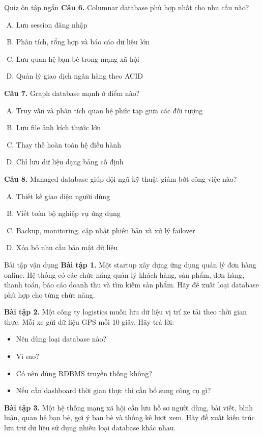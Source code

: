 \documentclass[aspectratio=169,11pt]{beamer}
\newcommand{\smallitem}{\setlength{\itemsep}{2pt}\setlength{\parskip}{0pt}}
\begin{document}
\begin{frame}[allowframebreaks]{Quiz ôn tập ngắn}
\textbf{Câu 6.} Columnar database phù hợp nhất cho nhu cầu nào?
\begin{enumerate}[A.]
  \item Lưu session đăng nhập
  \item Phân tích, tổng hợp và báo cáo dữ liệu lớn
  \item Lưu quan hệ bạn bè trong mạng xã hội
  \item Quản lý giao dịch ngân hàng theo ACID
\end{enumerate}

\textbf{Câu 7.} Graph database mạnh ở điểm nào?
\begin{enumerate}[A.]
  \item Truy vấn và phân tích quan hệ phức tạp giữa các đối tượng
  \item Lưu file ảnh kích thước lớn
  \item Thay thế hoàn toàn hệ điều hành
  \item Chỉ lưu dữ liệu dạng bảng cố định
\end{enumerate}

\textbf{Câu 8.} Managed database giúp đội ngũ kỹ thuật giảm bớt công việc nào?
\begin{enumerate}[A.]
  \item Thiết kế giao diện người dùng
  \item Viết toàn bộ nghiệp vụ ứng dụng
  \item Backup, monitoring, cập nhật phiên bản và xử lý failover
  \item Xóa bỏ nhu cầu bảo mật dữ liệu
\end{enumerate}
\end{frame}

\begin{frame}[allowframebreaks]{Bài tập vận dụng}
\small
\textbf{Bài tập 1.} Một startup xây dựng ứng dụng quản lý đơn hàng online. Hệ thống có các chức năng quản lý khách hàng, sản phẩm, đơn hàng, thanh toán, báo cáo doanh thu và tìm kiếm sản phẩm. Hãy đề xuất loại database phù hợp cho từng chức năng.

\vspace{3mm}
\textbf{Bài tập 2.} Một công ty logistics muốn lưu dữ liệu vị trí xe tải theo thời gian thực. Mỗi xe gửi dữ liệu GPS mỗi 10 giây. Hãy trả lời:
\begin{itemize}
  \smallitem
  \item Nên dùng loại database nào?
  \item Vì sao?
  \item Có nên dùng RDBMS truyền thống không?
  \item Nếu cần dashboard thời gian thực thì cần bổ sung công cụ gì?
\end{itemize}

\vspace{3mm}
\textbf{Bài tập 3.} Một hệ thống mạng xã hội cần lưu hồ sơ người dùng, bài viết, bình luận, quan hệ bạn bè, gợi ý bạn bè và thống kê lượt xem. Hãy đề xuất kiến trúc lưu trữ dữ liệu sử dụng nhiều loại database khác nhau.
\end{frame}
\end{document}
